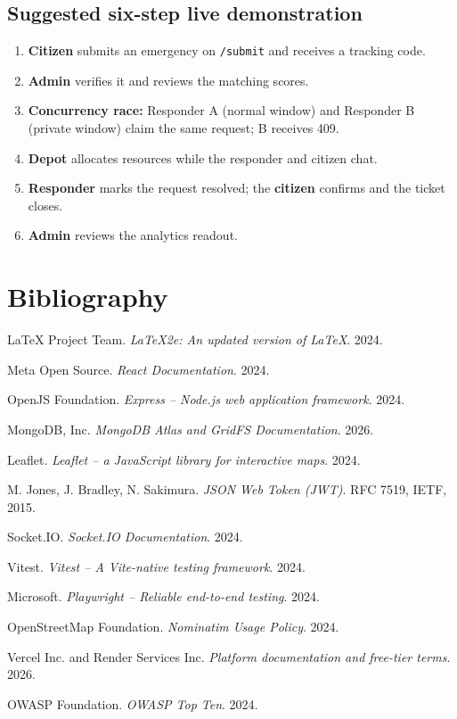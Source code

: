 \documentclass[11pt,a4paper]{article}
\newcommand{\tc}[1]{\texttt{\small #1}}
\begin{document}
\subsection*{Suggested six-step live demonstration}
\begin{enumerate}
\item \textbf{Citizen} submits an emergency on \tc{/submit} and receives a tracking code.
\item \textbf{Admin} verifies it and reviews the matching scores.
\item \textbf{Concurrency race:} Responder A (normal window) and Responder B (private window) claim the same request; B receives 409.
\item \textbf{Depot} allocates resources while the responder and citizen chat.
\item \textbf{Responder} marks the request resolved; the \textbf{citizen} confirms and the ticket closes.
\item \textbf{Admin} reviews the analytics readout.
\end{enumerate}

\newpage

\label{bib}
\section*{Bibliography}

\begin{enumerate}[label={[}\arabic*{]},leftmargin=0.34in]
\item LaTeX Project Team. \textit{LaTeX2e: An updated version of LaTeX}. 2024.
\item Meta Open Source. \textit{React Documentation}. 2024.
\item OpenJS Foundation. \textit{Express -- Node.js web application framework}. 2024.
\item MongoDB, Inc. \textit{MongoDB Atlas and GridFS Documentation}. 2026.
\item Leaflet. \textit{Leaflet -- a JavaScript library for interactive maps}. 2024.
\item M. Jones, J. Bradley, N. Sakimura. \textit{JSON Web Token (JWT)}. RFC 7519, IETF, 2015.
\item Socket.IO. \textit{Socket.IO Documentation}. 2024.
\item Vitest. \textit{Vitest -- A Vite-native testing framework}. 2024.
\item Microsoft. \textit{Playwright -- Reliable end-to-end testing}. 2024.
\item OpenStreetMap Foundation. \textit{Nominatim Usage Policy}. 2024.
\item Vercel Inc. and Render Services Inc. \textit{Platform documentation and free-tier terms}. 2026.
\item OWASP Foundation. \textit{OWASP Top Ten}. 2024.
\end{enumerate}
\end{document}
